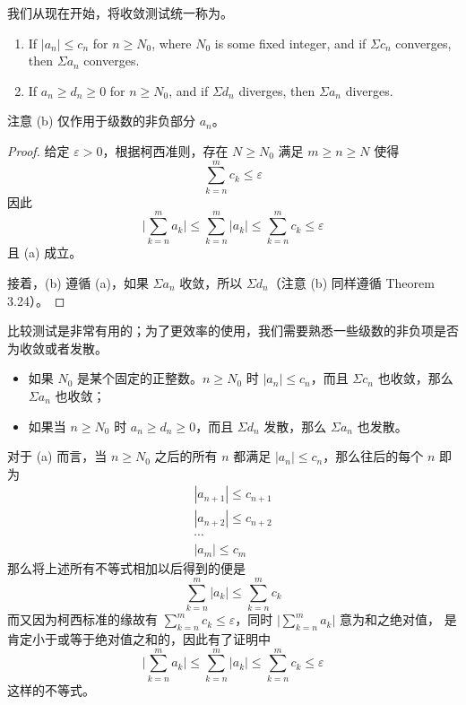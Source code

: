 \documentclass[../poma-notes.tex]{subfiles}
\begin{document}
我们从现在开始，将收敛测试统一称为。

\begin{theorem}\mbox{}\par
  \begin{enumerate}[label=(\alph*)]
    \item If $|a_n| \le c_n$ for $n \ge N_0$, where $N_0$ is some fixed integer, and if $\Sigma c_n$ converges,
          then $\Sigma a_n$ converges.
    \item If $a_n \ge d_n \ge 0$ for $n \ge N_0$, and if $\Sigma d_n$ diverges, then $\Sigma a_n$ diverges.
  \end{enumerate}
\end{theorem}

注意 (b) 仅作用于级数的非负部分 $a_n$。

\begin{proof}
  给定 $\varepsilon > 0$，根据柯西准则，存在 $N \ge N_0$ 满足 $m \ge n \ge N$ 使得
  \[ \sum_{k=n}^{m} c_k \le \varepsilon \]
  因此
  \[ \Bigg| \sum_{k=n}^{m} a_k \Bigg| \le \sum_{k=n}^{m} |a_k| \le \sum_{k=n}^{m} c_k \le \varepsilon \]
  且 (a) 成立。

  接着，(b) 遵循 (a)，如果 $\Sigma a_n$ 收敛，所以 $\Sigma d_n$（注意 (b) 同样遵循 Theorem 3.24）。
\end{proof}

比较测试是非常有用的；为了更效率的使用，我们需要熟悉一些级数的非负项是否为收敛或者发散。

\begin{anote}\mbox{}\par
  \begin{itemize}
    \item 如果 $N_0$ 是某个固定的正整数。$n \ge N_0$ 时 $|a_n| \le c_n$，而且 $\Sigma c_n$ 也收敛，那么 $\Sigma a_n$ 也收敛；
    \item 如果当 $n \ge N_0$ 时 $a_n \ge d_n \ge 0$，而且 $\Sigma d_n$ 发散，那么 $\Sigma a_n$ 也发散。
  \end{itemize}

  对于 (a) 而言，当 $n \ge N_0$ 之后的所有 $n$ 都满足 $|a_n| \le c_n$，那么往后的每个 $n$ 即为
  \begin{gather*}
    |a_{n+1}| \le c_{n+1} \\
    |a_{n+2}| \le c_{n+2} \\
    \cdots \\
    |a_{m}| \le c_{m}
  \end{gather*}
  那么将上述所有不等式相加以后得到的便是
  \[ \sum_{k=n}^{m} |a_k| \le \sum_{k=n}^{m} c_k \]
  而又因为柯西标准的缘故有 $\sum_{k=n}^{m} c_k \le \varepsilon$，同时 $\Bigg| \sum_{k=n}^{m} a_k \Bigg|$ 意为和之绝对值，
  是肯定小于或等于绝对值之和的，因此有了证明中
  \[ \Bigg| \sum_{k=n}^{m} a_k \Bigg| \le \sum_{k=n}^{m} |a_k| \le \sum_{k=n}^{m} c_k \le \varepsilon \]
  这样的不等式。
\end{anote}
\end{document}
